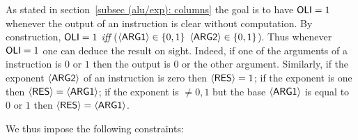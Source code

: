 As stated in section~\ref{subsec (alu/exp): columns}
the goal is to have $\textsf{OLI} = 1$ whenever the output of an instruction is clear without computation.
By construction, $\textsf{OLI} = 1$ \emph{iff} \big($\langle{}\textsf{ARG}\textsf{1}\rangle{} \in \{0,1\}$ \OR $\langle{}\textsf{ARG}\textsf{2}\rangle{} \in \{0,1\}$\big).
Thus whenever $\textsf{OLI} = 1$ one can deduce the result on sight.
Indeed, if one of the arguments of a  instruction is $0$ or $1$ then the output is $0$ or the other argument.
Similarly, if the exponent $\langle{}\textsf{ARG}\textsf{2}\rangle{}$ of an  instruction is zero then $\langle{}\textsf{RES}\rangle{} = 1$;
if the exponent is one then $\langle{}\textsf{RES}\rangle{} = \langle{}\textsf{ARG}\textsf{1}\rangle{}$; if the exponent is $\neq 0, 1$ but the base $\langle{}\textsf{ARG}\textsf{1}\rangle{}$ is equal to $0$ or $1$ then $\langle{}\textsf{RES}\rangle{} = \langle{}\textsf{ARG}\textsf{1}\rangle{}$.
\begin{center}
\end{center}
We thus impose the following constraints:
